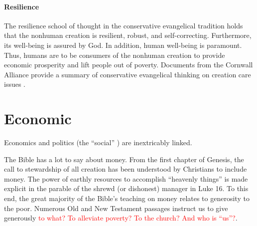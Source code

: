 \documentclass[12pt]{article}
\newcommand{\ins}[1]{\textcolor{red}{#1}}
\begin{document}
\paragraph{Resilience} 
\label{sec:resilience}

The resilience school of thought in the conservative evangelical tradition
holds that the nonhuman creation is resilient, robust, and self-correcting.
Furthermore, its well-being is assured by God.
In addition, human well-being is paramount. 
Thus, humans are to be consumers of the nonhuman creation 
to provide economic prosperity and
lift people out of poverty.
Documents from the Cornwall Alliance 
provide a summary of conservative evangelical thinking on creation care issues
\autocite{Cornwall:2006aa}.



%
%
%



\section{Economic}
\label{sec:economic}

Economics and politics (the ``social'' ) are inextricably linked.

The Bible has a lot to say about money. From the first chapter of Genesis, the call to
stewardship of all creation has been understood by Christians to include money. The power
of earthly resources to accomplish ``heavenly things'' is made explicit in the parable of
the shrewd (or dishonest) manager in Luke 16. To this end, the great majority of the
Bible's teaching on money relates to generosity to the poor. Numerous Old and New
Testament passages instruct us to give generously 
\ins{to what? To alleviate poverty? To the church?  And who is ``us''?}.
\end{document}
